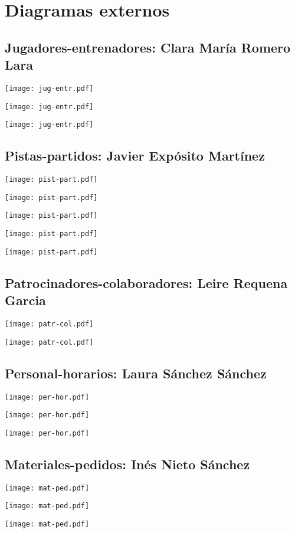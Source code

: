 \section{Diagramas externos}

\subsection{Jugadores-entrenadores: Clara María Romero Lara}

\texttt{[image: jug-entr.pdf]}

\texttt{[image: jug-entr.pdf]}

\texttt{[image: jug-entr.pdf]}

\pagebreak
\subsection{Pistas-partidos: Javier Expósito Martínez}

\texttt{[image: pist-part.pdf]}

\texttt{[image: pist-part.pdf]}

\texttt{[image: pist-part.pdf]}

\texttt{[image: pist-part.pdf]}

\texttt{[image: pist-part.pdf]}


\subsection{Patrocinadores-colaboradores: Leire Requena Garcia}

\texttt{[image: patr-col.pdf]}

\texttt{[image: patr-col.pdf]}

\pagebreak

\subsection{Personal-horarios: Laura Sánchez Sánchez}

\texttt{[image: per-hor.pdf]}

\texttt{[image: per-hor.pdf]}

\texttt{[image: per-hor.pdf]}

\subsection{Materiales-pedidos: Inés Nieto Sánchez}

\texttt{[image: mat-ped.pdf]}

\texttt{[image: mat-ped.pdf]}

\texttt{[image: mat-ped.pdf]}
